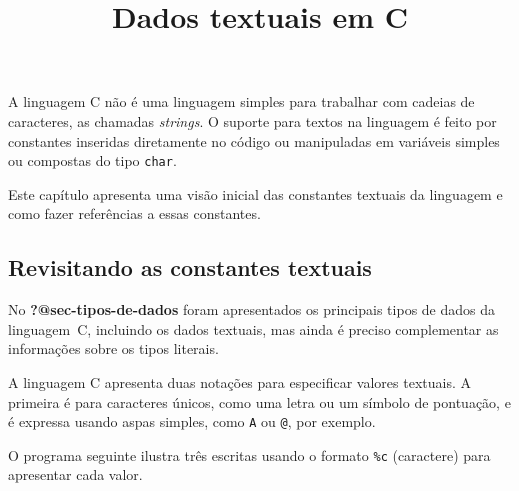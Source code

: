 \documentclass[
  letterpaper,
  DIV=11,
  numbers=noendperiod]{scrartcl}
\title{Dados textuais em C}
\author{}
\date{}
\renewcommand*\contentsname{Índice}
\newcommand\contentsname{Índice}
\begin{document}
\maketitle



\renewcommand*\contentsname{Índice}
{
\hypersetup{linkcolor=}
\setcounter{tocdepth}{3}
\tableofcontents
}

A linguagem C não é uma linguagem simples para trabalhar com cadeias de
caracteres, as chamadas \emph{strings}. O suporte para textos na
linguagem é feito por constantes inseridas diretamente no código ou
manipuladas em variáveis simples ou compostas do tipo \texttt{char}.

Este capítulo apresenta uma visão inicial das constantes textuais da
linguagem e como fazer referências a essas constantes.

\subsection{Revisitando as constantes
textuais}\label{revisitando-as-constantes-textuais}

No \textbf{?@sec-tipos-de-dados} foram apresentados os principais tipos
de dados da linguagem~C, incluindo os dados textuais, mas ainda é
preciso complementar as informações sobre os tipos literais.

A linguagem C apresenta duas notações para especificar valores textuais.
A primeira é para caracteres únicos, como uma letra ou um símbolo de
pontuação, e é expressa usando aspas simples, como
\texttt{\textquotesingle{}A\textquotesingle{}} ou
\texttt{\textquotesingle{}@\textquotesingle{}}, por exemplo.

O programa seguinte ilustra três escritas usando o formato \texttt{\%c}
(caractere) para apresentar cada valor.
\end{document}
